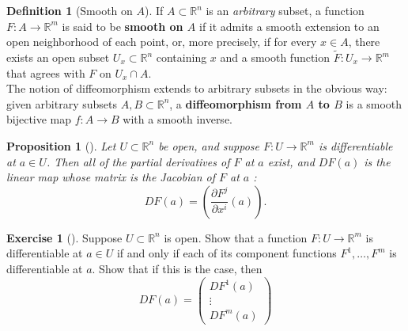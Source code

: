 \documentclass[reqno]{amsart}
\theoremstyle{plain}%
\newtheorem{proposition}[theorem]{Proposition}
\theoremstyle{definition}
\newtheorem{definition}[theorem]{Definition}
\newtheorem{exercise}[theorem]{Exercise}
\theoremstyle{remark}
\begin{document}
        \begin{definition}[Smooth on $A$]
        If $A \subset \mathbb{R}^{n}$ is an \textit{arbitrary} subset, a function
        $F  \colon A \to \mathbb{R}^{m}$ is said to be \textbf{smooth on $A$} if it
        admits a smooth extension to an open neighborhood of each point, or, more
        precisely, if for every $x \in A$, there exists an open subset
        $U_x \subset \mathbb{R}^{n}$ containing $x$ and a smooth function
        $\tilde{F}  \colon U_x \to \mathbb{R}^{m}$ that agrees with
        $F$ on $U_x \cap A$.\\
        The notion of diffeomorphism extends to arbitrary subsets in the obvious
        way: given arbitrary subsets $A,B \subset \mathbb{R}^{n}$,
        a \textbf{diffeomorphism from $A$ to $B$} is a smooth bijective map
        $f  \colon A \to B$ with a smooth inverse.
        \end{definition}


        \begin{proposition}[]\label{diff-implies-partials-exist}
        Let $U \subset \mathbb{R}^{n}$ be open, and suppose $F  \colon U \to
        \mathbb{R}^{m}$ is differentiable at $a \in U$. Then all of the partial
        derivatives of $F$ at $a$ exist, and $DF(a)$ is the linear map whose matrix
        is the Jacobian of $F$ at $a$ :
        \[
        DF (a) = \left( \frac{\partial F^{j}}{\partial x^{i}}(a) \right).
        \] 
        \end{proposition}

        \begin{exercise}[]
        Suppose $U \subset \mathbb{R}^{n}$ is open. Show that a function
        $F  \colon U \to \mathbb{R}^{m}$ is differentiable at $a \in U$ if and only
        if each of its component functions $F^{1},\ldots, F^{m}$ is differentiable
        at $a$. Show that if this is the case, then
        \[
        DF(a) = \begin{pmatrix} 
            DF^{1}(a)\\
            \vdots \\
            DF^{m}(a)
        \end{pmatrix} 
        \] 
        \end{exercise}
\end{document}
